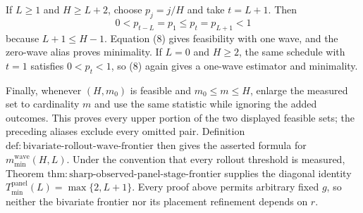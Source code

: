 If \(L\geq1\) and \(H\geq L+2\), choose \(p_j=j/H\) and take \(t=L+1\).  Then
\[
 0<p_{t-L}=p_1\leq p_t=p_{L+1}<1
\]
because \(L+1\leq H-1\).  Equation (8) gives feasibility with one wave, and the zero-wave alias proves minimality.  If \(L=0\) and \(H\geq2\), the same schedule with \(t=1\) satisfies \(0<p_t<1\), so (8) again gives a one-wave estimator and minimality.

Finally, whenever \((H,m_0)\) is feasible and \(m_0\leq m\leq H\), enlarge the measured set to cardinality \(m\) and use the same statistic while ignoring the added outcomes.  This proves every upper portion of the two displayed feasible sets; the preceding aliases exclude every omitted pair.  Definition \(\mathrm{def:bivariate\text{-}rollout\text{-}wave\text{-}frontier}\) then gives the asserted formula for \(m_{\min}^{\mathrm{wave}}(H,L)\).  Under the convention that every rollout threshold is measured, Theorem \(\mathrm{thm:sharp\text{-}observed\text{-}panel\text{-}stage\text{-}frontier}\) supplies the diagonal identity \(T_{\min}^{\mathrm{panel}}(L)=\max\{2,L+1\}\).  Every proof above permits arbitrary fixed \(g\), so neither the bivariate frontier nor its placement refinement depends on \(r\).